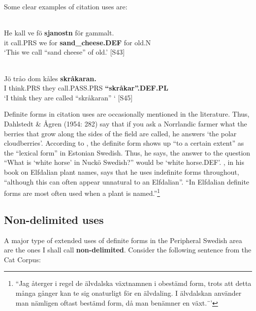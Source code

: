 
Some clear examples of citation uses are:


\ea \label{} 
\\
\gll 	He  kall  ve  fö  \textbf{sjanostn} för  gammalt.\\
		it  call.PRS  we  for  \textbf{sand\_cheese.DEF} for  old.N\\
\glt 	‘This we call “sand cheese” of old.’ [S43]

\z

\ea \label{} 
\\
\gll Jö  tråo  dom  kåles  \textbf{skråkaran.}\\
I  think.PRS  they  call.PASS.PRS  \textbf{“skråkar”.DEF.PL}\\
\glt ‘I think they are called “skråkaran” ‘ [S45]

\z

Definite forms in citation uses are occasionally mentioned in the literature. Thus, Dahlstedt \& Ågren (1954: 282) say that if you ask a Norrlandic farmer what the berries that grow along the sides of the field are called, he answers  ‘the polar cloudberries’. According to \citet[82]{Lagman1979}, the definite form shows up “to a certain extent” as the “lexical form” in Estonian Swedish. Thus, he says, the answer to the question “What is ‘white horse’ in Nuckö Swedish?” would be  ‘white horse.DEF’. \citet[8]{Steensland1994}, in his book on Elfdalian plant names, says that he uses indefinite forms throughout, “although this can often appear unnatural to an Elfdalian”.  “In Elfdalian definite forms are most often used when a plant is named.”\footnote{ “Jag återger i regel de älvdalska växtnamnen i obestämd form, trots att detta många gånger kan te sig onaturligt för en älvdaling. I älvdalskan använder man nämligen oftast bestämd form, då man benämner en växt.¨’}


\subsection{ Non-delimited uses}
\label{bkm:Ref105226557}
A major type of extended uses of definite forms in the Peripheral Swedish area are the ones I shall call \textbf{non-delimited}. Consider the following sentence from the Cat Corpus: 

